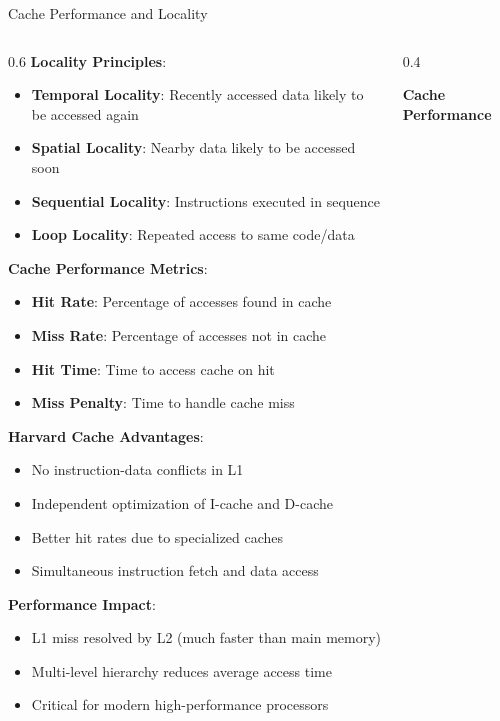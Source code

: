 \documentclass[aspectratio=169]{beamer}
\newcommand{\concept}[1]{\textbf{\color{darkblue}#1}}
\begin{document}
\begin{frame}{Cache Performance and Locality}
\begin{columns}
\begin{column}{0.6\textwidth}
\concept{Locality Principles}:
\begin{itemize}
\item \textbf{Temporal Locality}: Recently accessed data likely to be accessed again
\item \textbf{Spatial Locality}: Nearby data likely to be accessed soon
\item \textbf{Sequential Locality}: Instructions executed in sequence
\item \textbf{Loop Locality}: Repeated access to same code/data
\end{itemize}

\vspace{0.3cm}
\concept{Cache Performance Metrics}:
\begin{itemize}
\item \textbf{Hit Rate}: Percentage of accesses found in cache
\item \textbf{Miss Rate}: Percentage of accesses not in cache
\item \textbf{Hit Time}: Time to access cache on hit
\item \textbf{Miss Penalty}: Time to handle cache miss
\end{itemize}

\vspace{0.3cm}
\concept{Harvard Cache Advantages}:
\begin{itemize}
\item No instruction-data conflicts in L1
\item Independent optimization of I-cache and D-cache
\item Better hit rates due to specialized caches
\item Simultaneous instruction fetch and data access
\end{itemize}

\vspace{0.3cm}
\concept{Performance Impact}:
\begin{itemize}
\item L1 miss resolved by L2 (much faster than main memory)
\item Multi-level hierarchy reduces average access time
\item Critical for modern high-performance processors
\end{itemize}
\end{column}
\begin{column}{0.4\textwidth}
\begin{center}
\textbf{Cache Performance}
\vspace{0.3cm}


\end{center}
\end{column}
\end{columns}
\end{frame}
\end{document}
